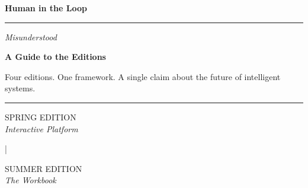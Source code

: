 \documentclass[12pt, a4paper]{article}
\newcommand{\amberrule}{%
  {\color{rulecolor}\rule{\linewidth}{0.5pt}}%
}
\begin{document}

\thispagestyle{empty}

\vspace*{3.5cm}

\begin{center}

  {\footnotesize\sffamily\color{midgrey}}

  \vspace{0.9cm}

  \begin{tcolorbox}[
    enhanced,
    colback=white,
    colframe=amber,
    arc=0pt,
    boxrule=0pt,
    leftrule=4pt,
    left=16pt, right=16pt,
    top=16pt, bottom=16pt,
    width=\textwidth,
  ]
    \begin{center}
      {\Huge\bfseries\color{charcoal} Human in the Loop}

      \vspace{8pt}
      \amberrule

      \vspace{10pt}
      {\large\color{midgrey}\itshape Misunderstood}

      \vspace{20pt}
      {\Large\bfseries\sffamily\color{amberdeep} A Guide to the Editions}
    \end{center}
  \end{tcolorbox}

  \vspace{1.6cm}

  {\small\sffamily\color{midgrey} Four editions. One framework. A single claim about the future of intelligent systems.}

  \vspace{2.4cm}

  \amberrule

  \vspace{0.5cm}

  \begin{minipage}{0.48\textwidth}
    \centering
    {\footnotesize\color{springgreen}\sffamily SPRING EDITION}\\
    {\small\itshape Interactive Platform}
  \end{minipage}%
  \begin{minipage}{0.04\textwidth}\centering\color{amber}|\end{minipage}%
  \begin{minipage}{0.48\textwidth}
    \centering
    {\footnotesize\color{summergold}\sffamily SUMMER EDITION}\\
    {\small\itshape The Workbook}
  \end{minipage}


\end{center}
\end{document}

